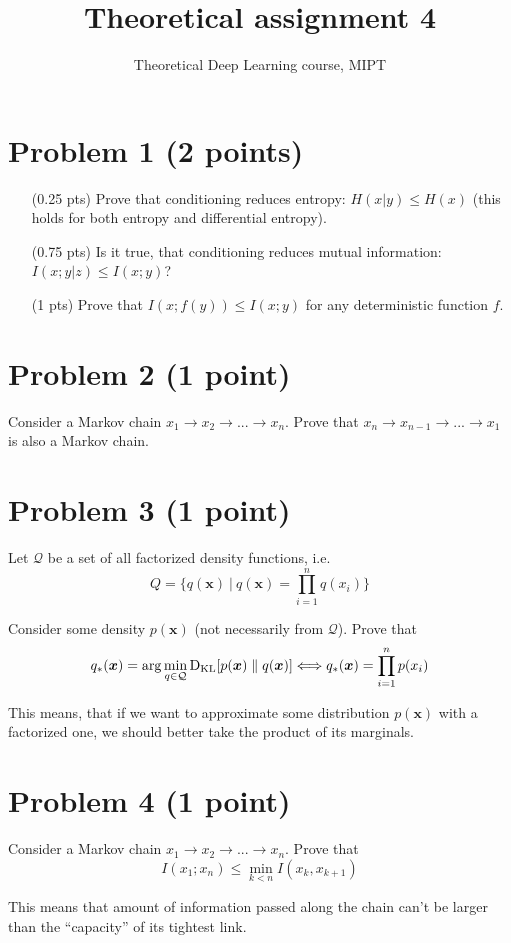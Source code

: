 \documentclass{article}
\title{Theoretical assignment 4}
\author{Theoretical Deep Learning course, MIPT}
\date{}
\begin{document}
\maketitle
\section*{Problem 1 (2 points)}
\begin{enumerate}
    \item[(0.25 pts)] Prove that conditioning reduces entropy: $H(x | y) \leq H(x)$ (this holds for both entropy and differential entropy).
    \item[(0.75 pts)] Is it true, that conditioning reduces mutual information: $I(x; y | z) \leq I(x; y)$?
    \item[(1 pts)] Prove that $I(x; f(y)) \leq I(x; y)$ for any deterministic function $f$.
\end{enumerate}

\section*{Problem 2 (1 point)}
Consider a Markov chain $x_1 \to x_2 \to ... \to x_n$.
Prove that $x_n \to x_{n-1} \to ... \to x_1$ is also a Markov chain.

\section*{Problem 3 (1 point)}
Let $\mathcal{Q}$ be a set of all factorized density functions, i.e.
\[
Q = \big\{ q(\bm x)\ \big|\ q(\bm x) = \prod_{i=1}^n q(x_i) \big\}
\]

Consider some density $p(\bm x)$ (not necessarily from $\mathcal{Q}$).
Prove that
\[
q_*(\bm x) = \arg \min_{q \in \mathcal{Q}} \text{D}_\text{KL}[p(\bm x) \parallel q(\bm x)] \Longleftrightarrow q_*(\bm x) = \prod_{i=1}^n p(x_i)
\]

This means, that if we want to approximate some distribution $p(\bm x)$ with a factorized one, we should better take the product of its marginals.

\section*{Problem 4 (1 point)}
Consider a Markov chain $x_1 \to x_2 \to ... \to x_n$.
Prove that
\[
I(x_1; x_n) \leq \min_{k<n} I(x_k, x_{k+1})
\]

This means that amount of information passed along the chain can't be larger than the ``capacity'' of its tightest link.
\end{document}
